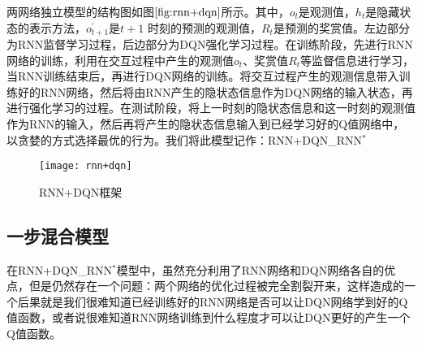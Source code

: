 
两网络独立模型的结构图如图$\ref{fig:rnn+dqn}$所示。其中，$o_{t}$是观测值，$h_{t}$是隐藏状态的表示方法，$o_{t+1}^{'}$是$t+1$ 时刻的预测的观测值，$R_{t}$是预测的奖赏值。左边部分为RNN监督学习过程，后边部分为DQN强化学习过程。在训练阶段，先进行RNN网络的训练，利用在交互过程中产生的观测值$o_{t}$、奖赏值$R_{t}$等监督信息进行学习，当RNN训练结束后，再进行DQN网络的训练。将交互过程产生的观测信息带入训练好的RNN网络，然后将由RNN产生的隐状态信息作为DQN网络的输入状态，再进行强化学习的过程。在测试阶段，将上一时刻的隐状态信息和这一时刻的观测值作为RNN的输入，然后再将产生的隐状态信息输入到已经学习好的Q值网络中，以贪婪的方式选择最优的行为。我们将此模型记作：RNN+DQN_RNN$^{*}$


\begin{figure}[htbp]
\centering
\texttt{[image: rnn+dqn]}
\caption{RNN+DQN框架}
\label{fig:rnn+dqn}
\end{figure}

\subsection{一步混合模型}

在RNN+DQN_RNN$^{*}$模型中，虽然充分利用了RNN网络和DQN网络各自的优点，但是仍然存在一个问题：两个网络的优化过程被完全割裂开来，这样造成的一个后果就是我们很难知道已经训练好的RNN网络是否可以让DQN网络学到好的Q值函数，或者说很难知道RNN网络训练到什么程度才可以让DQN更好的产生一个Q值函数。

